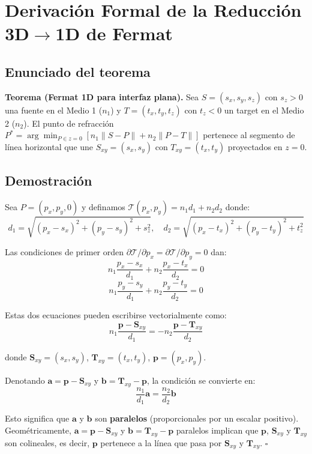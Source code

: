\documentclass[12pt,a4paper,oneside]{book}
\begin{document}
\appendix
\chapter{Derivación Formal de la Reducción 3D$\to$1D de Fermat}

\section{Enunciado del teorema}

\begin{mdframed}
\textbf{Teorema (Fermat 1D para interfaz plana).}
Sea $S = (s_x, s_y, s_z)$ con $s_z > 0$ una fuente en el Medio 1 ($n_1$) y $T = (t_x, t_y, t_z)$ con $t_z < 0$ un target en el Medio 2 ($n_2$). El punto de refracción $P^* = \arg\min_{P\in z=0} [n_1\|S-P\|+n_2\|P-T\|]$ pertenece al segmento de línea horizontal que une $S_{xy}=(s_x,s_y)$ con $T_{xy}=(t_x,t_y)$ proyectados en $z=0$.
\end{mdframed}

\section{Demostración}

Sea $P = (p_x, p_y, 0)$ y definamos $\mathcal{T}(p_x,p_y) = n_1 d_1 + n_2 d_2$ donde:
\[
d_1 = \sqrt{(p_x-s_x)^2+(p_y-s_y)^2+s_z^2}, \quad d_2 = \sqrt{(p_x-t_x)^2+(p_y-t_y)^2+t_z^2}
\]

Las condiciones de primer orden $\partial\mathcal{T}/\partial p_x = \partial\mathcal{T}/\partial p_y = 0$ dan:
\[
n_1\frac{p_x-s_x}{d_1} + n_2\frac{p_x-t_x}{d_2} = 0
\]
\[
n_1\frac{p_y-s_y}{d_1} + n_2\frac{p_y-t_y}{d_2} = 0
\]

Estas dos ecuaciones pueden escribirse vectorialmente como:
\[
n_1\frac{\mathbf{p}-\mathbf{S}_{xy}}{d_1} = -n_2\frac{\mathbf{p}-\mathbf{T}_{xy}}{d_2}
\]

donde $\mathbf{S}_{xy}=(s_x,s_y)$, $\mathbf{T}_{xy}=(t_x,t_y)$, $\mathbf{p}=(p_x,p_y)$.

Denotando $\mathbf{a} = \mathbf{p}-\mathbf{S}_{xy}$ y $\mathbf{b} = \mathbf{T}_{xy}-\mathbf{p}$, la condición se convierte en:
\[
\frac{n_1}{d_1}\mathbf{a} = \frac{n_2}{d_2}\mathbf{b}
\]

Esto significa que $\mathbf{a}$ y $\mathbf{b}$ son \textbf{paralelos} (proporcionales por un escalar positivo). Geométricamente, $\mathbf{a} = \mathbf{p}-\mathbf{S}_{xy}$ y $\mathbf{b} = \mathbf{T}_{xy}-\mathbf{p}$ paralelos implican que $\mathbf{p}$, $\mathbf{S}_{xy}$ y $\mathbf{T}_{xy}$ son colineales, es decir, $\mathbf{p}$ pertenece a la línea que pasa por $\mathbf{S}_{xy}$ y $\mathbf{T}_{xy}$. $\square$
\end{document}
